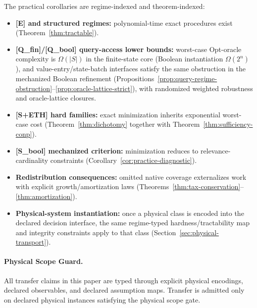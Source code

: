 The practical corollaries are regime-indexed and theorem-indexed:
\begin{itemize}
\item \textbf{[E] and structured regimes:} polynomial-time exact procedures exist (Theorem~\ref{thm:tractable}).
\item \textbf{[Q\_fin]/[Q\_bool] query-access lower bounds:} worst-case Opt-oracle complexity is $\Omega(|S|)$ in the finite-state core (Boolean instantiation $\Omega(2^n)$), and value-entry/state-batch interfaces satisfy the same obstruction in the mechanized Boolean refinement (Propositions~\ref{prop:query-regime-obstruction}--\ref{prop:oracle-lattice-strict}), with randomized weighted robustness and oracle-lattice closures.
\item \textbf{[S+ETH] hard families:} exact minimization inherits exponential worst-case cost (Theorem~\ref{thm:dichotomy} together with Theorem~\ref{thm:sufficiency-conp}).
\item \textbf{[S\_bool] mechanized criterion:} minimization reduces to relevance-cardinality constraints (Corollary~\ref{cor:practice-diagnostic}).
\item \textbf{Redistribution consequences:} omitted native coverage externalizes work with explicit growth/amortization laws (Theorems~\ref{thm:tax-conservation}--\ref{thm:amortization}).
\item \textbf{Physical-system instantiation:} once a physical class is encoded into the declared decision interface, the same regime-typed hardness/tractability map and integrity constraints apply to that class (Section~\ref{sec:physical-transport}).
\end{itemize}

\paragraph{Physical Scope Guard.}
All transfer claims in this paper are typed through explicit physical encodings, declared observables, and declared assumption maps. Transfer is admitted only on declared physical instances satisfying the physical scope gate.

